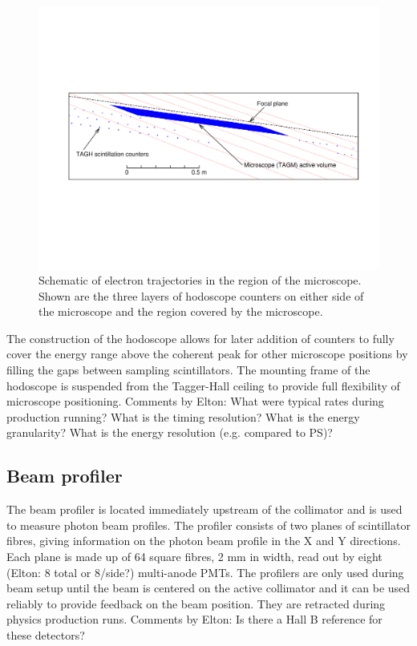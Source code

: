 \begin{figure}[tbp]
\begin{center}
      \includegraphics[width=0.95\linewidth,viewport=80 200 750 400]{figures/BEAM_taggerdetectors.pdf}
\caption{Schematic of electron trajectories in the region of the microscope. Shown are the three layers of hodoscope counters on either side of the microscope and the 
               region covered by the microscope.
       \label{fig:beam:BEAM_taggerdetectors}  }

\end{center}
\end{figure}

The construction of the hodoscope allows for later addition of counters to fully cover the energy range above the coherent peak for other microscope positions by filling the gaps between sampling scintillators. The mounting frame of the hodoscope is suspended from the Tagger-Hall ceiling to provide full flexibility of microscope positioning.
{\color{red} Comments by Elton: What were typical rates during production running? What is the timing resolution? What is the energy granularity? What is the energy resolution (e.g. compared to PS)?}

\subsection{Beam profiler}
The beam profiler is located immediately upstream of the collimator and is used to measure photon beam profiles.
The profiler consists of two planes of scintillator fibres, giving information on the photon beam profile in the X and Y directions.
Each plane is made up of 64 square fibres, 2 mm in width, read out by eight {\color{red} (Elton: 8 total or 8/side?)} multi-anode PMTs. The profilers are only used during beam setup until
the beam is centered on the active collimator and it can be used reliably to provide feedback on the beam position. They are retracted during physics production runs.
{\color{red} Comments by Elton: Is there a Hall B reference for these detectors?}

